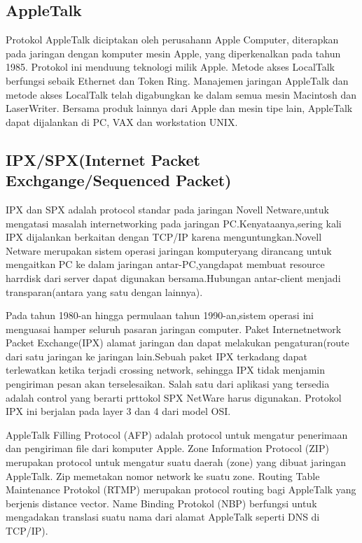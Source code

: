  \subsection{AppleTalk} 
Protokol AppleTalk diciptakan oleh perusahann Apple Computer, diterapkan pada jaringan dengan komputer mesin Apple, yang diperkenalkan 
pada tahun 1985. Protokol ini menduung teknologi milik Apple. Metode akses LocalTalk berfungsi sebaik Ethernet dan Token Ring. Manajemen 
jaringan AppleTalk dan metode akses LocalTalk telah digabungkan ke dalam semua mesin Macintosh dan LaserWriter. Bersama produk lainnya 
dari Apple dan mesin tipe lain, AppleTalk dapat dijalankan di PC, VAX dan workstation UNIX.

\subsection{IPX/SPX(Internet Packet Exchgange/Sequenced Packet)}  
IPX dan SPX adalah protocol standar pada jaringan Novell Netware,untuk mengatasi masalah internetworking pada jaringan 
PC.Kenyataanya,sering kali IPX dijalankan berkaitan dengan TCP/IP karena menguntungkan.Novell Netware merupakan sistem operasi jaringan 
komputeryang dirancang untuk mengaitkan PC ke dalam jaringan antar-PC,yangdapat membuat resource harrdisk dari server dapat digunakan 
bersama.Hubungan antar-client menjadi transparan(antara yang satu dengan lainnya).

Pada tahun 1980-an hingga permulaan tahun 1990-an,sistem operasi ini menguasai hamper seluruh pasaran jaringan computer.
Paket Internetnetwork Packet Exchange(IPX) alamat jaringan dan dapat melakukan pengaturan(route dari satu jaringan ke jaringan 
lain.Sebuah paket IPX terkadang dapat terlewatkan ketika terjadi crossing network, sehingga IPX tidak menjamin pengiriman pesan akan 
terselesaikan. Salah satu dari aplikasi yang tersedia adalah control yang berarti prttokol SPX NetWare harus digunakan. Protokol IPX ini 
berjalan pada layer 3 dan 4 dari model OSI.

AppleTalk Filling Protocol (AFP) adalah protocol untuk  mengatur penerimaan dan pengiriman file dari komputer Apple.
Zone Information Protocol (ZIP) merupakan protocol untuk mengatur suatu daerah (zone) yang dibuat jaringan AppleTalk. Zip memetakan 
nomor network ke suatu zone.
Routing Table Maintenance Protokol (RTMP) merupakan protocol routing bagi AppleTalk yang berjenis distance vector.
Name Binding Protokol (NBP) berfungsi untuk mengadakan translasi suatu nama dari alamat AppleTalk seperti DNS di TCP/IP).





